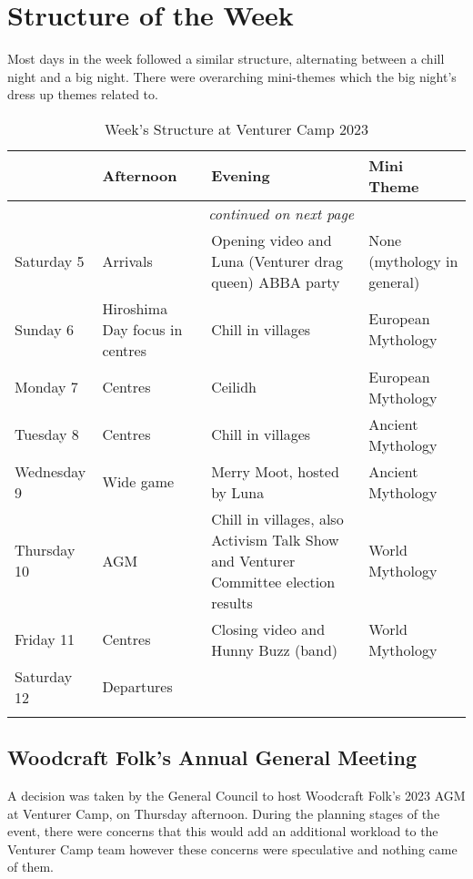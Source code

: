\chapter{Structure of the Week}

Most days in the week followed a similar structure, alternating between a chill night and a big night. There were overarching mini-themes which the big night's dress up themes related to. 

{\RaggedRight \centering
\begin{longtable}{p{} p{} p{} p{}}
 & \textbf{Afternoon} & \textbf{Evening} & \textbf{Mini Theme} \\ 
\hline
\endhead

\multicolumn{3}{r}{\footnotesize\itshape continued on next page}\\
\endfoot 

\endlastfoot

Saturday 5 & Arrivals & Opening video and Luna (Venturer drag queen) ABBA party & None (mythology in general) \\
\hline
Sunday 6 & Hiroshima Day focus in centres & Chill in villages & European Mythology \\
\hline
Monday 7 & Centres & Ceilidh & European Mythology \\
\hline
Tuesday 8 & Centres & Chill in villages & Ancient Mythology \\
\hline
Wednesday 9 & Wide game & Merry Moot, hosted by Luna & Ancient Mythology \\
\hline
Thursday 10 & AGM & Chill in villages, also Activism Talk Show and Venturer Committee election results & World Mythology \\
\hline
Friday 11 & Centres & Closing video and Hunny Buzz (band) & World Mythology \\
\hline
Saturday 12 & Departures &  & \\
\hline

\caption{Week's Structure at Venturer Camp 2023}
\end{longtable}
}%

\section{Woodcraft Folk's Annual General Meeting}
A decision was taken by the General Council to host Woodcraft Folk's 2023 AGM at Venturer Camp, on Thursday afternoon. During the planning stages of the event, there were concerns that this would add an additional workload to the Venturer Camp team however these concerns were speculative and nothing came of them.\\


